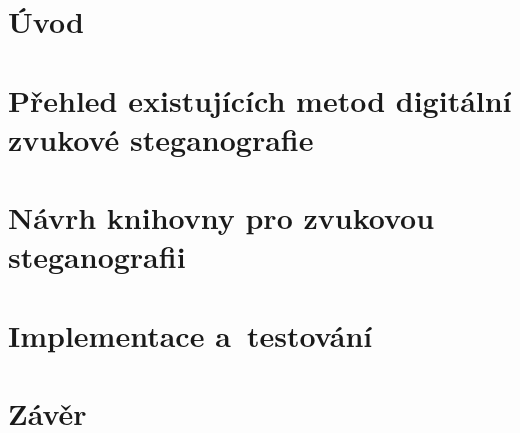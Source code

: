 \chapter{Úvod}
\label{cha:introduction}



\chapter{Přehled existujících metod digitální zvukové steganografie}
\label{cha:summary}



\chapter{Návrh knihovny pro zvukovou steganografii}
\label{cha:design}



\chapter{Implementace a~testování}
\label{cha:implementation}



\chapter{Závěr}
\label{cha:conclusion}
